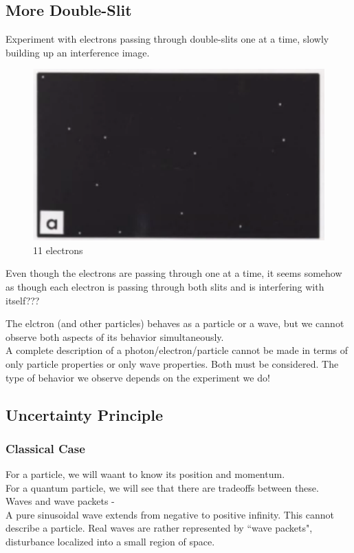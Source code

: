 \documentclass[class=article,crop=false]{standalone}
\begin{document}
\subsection{More Double-Slit}
Experiment with electrons passing through double-slits one at a time, slowly building up an interference image. \\

\begin{figure}[h!]
	\centering
	\includegraphics[width=.6\linewidth]{./Images/wave1.png}
	\caption{11 electrons}
\end{figure}

Even though the electrons are passing through one at a time, it seems somehow as though each electron is passing through both slits and is interfering with itself???\\

\begin{result}
	The elctron (and other particles) behaves as a particle or a wave, but we cannot observe both aspects of its behavior simultaneously.\\
	A complete description of a photon/electron/particle cannot be made in terms of only particle properties or only wave properties. Both must be considered. The type of behavior we observe depends on the experiment we do!
\end{result}

\subsection{Uncertainty Principle}
\subsubsection{Classical Case}
For a particle, we will waant to know its position and momentum. \\
For a quantum particle, we will see that there are tradeoffs between these.\\

Waves and wave packets - \\
A pure sinusoidal wave extends from negative to positive infinity. This cannot describe a particle. Real waves are rather represented by ``wave packets", disturbance localized into a small region of space. \\
\end{document}
